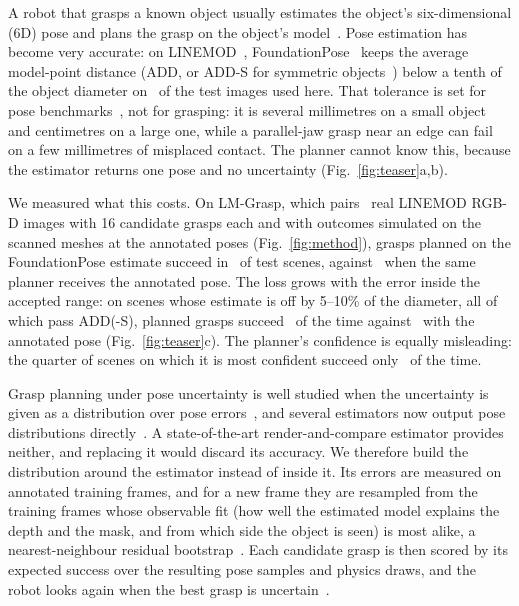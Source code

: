 \documentclass[pdflatex,sn-nature,iicol]{sn-jnl}
\begin{document}
A robot that grasps a known object usually estimates the object's six-dimensional (6D) pose and plans the grasp on the object's model~\cite{xiang2018posecnn,tremblay2018dope,deng2020selfsup}. Pose estimation has become very accurate: on LINEMOD~\cite{hinterstoisser2012}, FoundationPose~\cite{wen2024foundationpose} keeps the average model-point distance (ADD, or ADD-S for symmetric objects~\cite{hodan2016eval}) below a tenth of the object diameter on \FpAdd\ of the test images used here. That tolerance is set for pose benchmarks~\cite{hodan2018bop}, not for grasping: it is several millimetres on a small object and centimetres on a large one, while a parallel-jaw grasp near an edge can fail on a few millimetres of misplaced contact. The planner cannot know this, because the estimator returns one pose and no uncertainty (Fig.~\ref{fig:teaser}a,b).

We measured what this costs. On LM-Grasp, which pairs \NScenes\ real LINEMOD RGB-D images with 16 candidate grasps each and with outcomes simulated on the scanned meshes at the annotated poses (Fig.~\ref{fig:method}), grasps planned on the FoundationPose estimate succeed in \PointTop\ of test scenes, against \GtTop\ when the same planner receives the annotated pose. The loss grows with the error inside the accepted range: on scenes whose estimate is off by 5--10\% of the diameter, all of which pass ADD(-S), planned grasps succeed \BinHiPoint\ of the time against \BinHiAnnotated\ with the annotated pose (Fig.~\ref{fig:teaser}c). The planner's confidence is equally misleading: the quarter of scenes on which it is most confident succeed only \PointSel\ of the time.

Grasp planning under pose uncertainty is well studied when the uncertainty is given as a distribution over pose errors~\cite{weisz2012poseerror,hsiao2011robust,mahler2016dexnet1}, and several estimators now output pose distributions directly~\cite{deng2021poserbpf,murphy2021ipdf,haugaard2023spyropose,shi2021fastuq}. A state-of-the-art render-and-compare estimator provides neither, and replacing it would discard its accuracy. We therefore build the distribution around the estimator instead of inside it. Its errors are measured on annotated training frames, and for a new frame they are resampled from the training frames whose observable fit (how well the estimated model explains the depth and the mask, and from which side the object is seen) is most alike, a nearest-neighbour residual bootstrap~\cite{efron1979bootstrap,lall1996nnboot}. Each candidate grasp is then scored by its expected success over the resulting pose samples and physics draws, and the robot looks again when the best grasp is uncertain~\cite{bajcsy1988active,breyer2022nbv}.
\end{document}
